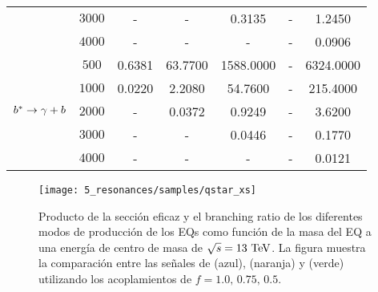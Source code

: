 \begin{table}[ht!]
{\begin{tabular}{lcccccc}
            & $3000$    & -             & -         & 0.3135        & -         & 1.2450        \\
            & $4000$    & -             & -         & -             & -         & 0.0906        \\
            \midrule
            \multirow{5}{*}{\(b^{*} \rightarrow \gamma + b\)}
            & $500$     & 0.6381        & 63.7700   & 1588.0000     & -         & 6324.0000     \\
            & $1000$    & 0.0220        & 2.2080    & 54.7600       & -         & 215.4000      \\
            & $2000$    & -             & 0.0372    & 0.9249        & -         & 3.6200        \\
            & $3000$    & -             & -         & 0.0446        & -         & 0.1770        \\
            & $4000$    & -             & -         & -             & -         & 0.0121        \\
            \bottomrule
        \end{tabular}
    }
    \label{tab:samples:samples:sig:qstar:xs}
\end{table}

\begin{figure}[ht!]
    \centering
    \texttt{[image: 5\_resonances/samples/qstar\_xs]}
    \caption{Producto de la sección eficaz y el branching ratio de los diferentes modos de producción de los \acp{EQ} como función de la masa del \ac{EQ} a una energía de centro de masa de \(\sqrt{s}=13~\text{TeV}\). La figura muestra la comparación entre las señales de \qstar (azul), \cstar (naranja) y \bstar (verde) utilizando los acoplamientos de \(f=1.0,\, 0.75,\, 0.5\).}
    \label{fig:samples:samples:sig:qstar:xs}
\end{figure}






